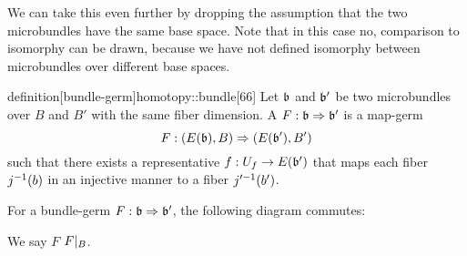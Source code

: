 \begin{myparagraph}
    We can take this even further by dropping the assumption
    that the two microbundles have the same base space.
    Note that in this case no, comparison to isomorphy can be drawn,
    because we have not defined isomorphy between microbundles over different base spaces.
\end{myparagraph}

\begin{mystatement}{definition}[bundle-germ]{homotopy::bundle}[66]
    Let $\bb$ and $\bb'$ be two microbundles over $B$ and $B'$
    with the same fiber dimension.
    A  $\germdef{F}{\bb}{\bb'}$ is a map-germ
    \[ \germdef{F}{(E(\bb), B)}{(E(\bb'), B')} \]
    such that there exists a representative $f: U_f \to E(\bb')$
    that maps each fiber $j^{-1}(b)$ in an injective manner to a fiber $j'^{-1}(b')$.
\end{mystatement}

\begin{myparagraph}
    For a bundle-germ $\germdef{F}{\bb}{\bb'}$, the following diagram commutes:
    \begin{center}
    \end{center}
    We say $F$  $F\vert_{B}$.
    
\end{myparagraph}